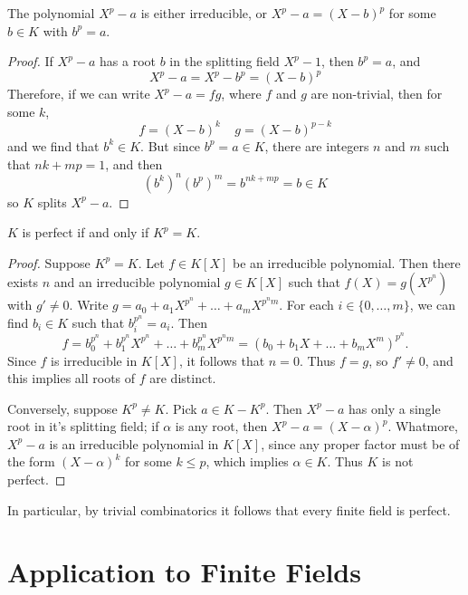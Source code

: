 \begin{lemma}
	The polynomial $X^p - a$ is either irreducible, or $X^p - a = (X - b)^p$ for some $b \in K$ with $b^p = a$.
\end{lemma}
\begin{proof}
    If $X^p - a$ has a root $b$ in the splitting field $X^p - 1$, then $b^p = a$, and
    \[ X^p - a = X^p - b^p = (X - b)^p \]
    Therefore, if we can write $X^p - a = fg$, where $f$ and $g$ are non-trivial, then for some $k$,
    \[ f = (X - b)^k\ \ \ \ \ g = (X - b)^{p - k} \]
    and we find that $b^k \in K$. But since $b^p = a \in K$, there are integers $n$ and $m$ such that $nk + mp = 1$, and then
    \[ (b^k)^n(b^p)^m = b^{nk + mp} = b \in K \]
    so $K$ splits $X^p - a$.
\end{proof}

\begin{prop}
    $K$ is perfect if and only if $K^p = K$.
\end{prop}
\begin{proof}
	Suppose $K^p = K$. Let $f \in K[X]$ be an irreducible polynomial. Then there exists $n$ and an irreducible polynomial $g \in K[X]$ such that $f(X) = g(X^{p^n})$ with $g' \neq 0$. Write $g = a_0 + a_1 X^{p^n} + \dots + a_m X^{p^nm}$. For each $i \in \{ 0, \dots, m \}$, we can find $b_i \in K$ such that $b_i^{p^n} = a_i$. Then
	\[ f = b_0^{p^n} + b_1^{p^n} X^{p^n} + \dots + b_m^{p^n} X^{p^nm} = (b_0 + b_1 X + \dots + b_m X^m)^{p^n}. \]
	Since $f$ is irreducible in $K[X]$, it follows that $n = 0$. Thus $f = g$, so $f' \neq 0$, and this implies all roots of $f$ are distinct.

	Conversely, suppose $K^p \neq K$. Pick $a \in K - K^p$. Then $X^p - a$ has only a single root in it's splitting field; if $\alpha$ is any root, then $X^p - a = (X - \alpha)^p$. Whatmore, $X^p - a$ is an irreducible polynomial in $K[X]$, since any proper factor must be of the form $(X - \alpha)^k$ for some $k \leq p$, which implies $\alpha \in K$. Thus $K$ is not perfect.
\end{proof}

\begin{remark}
	In particular, by trivial combinatorics it follows that every finite field is perfect.
\end{remark}





\section{Application to Finite Fields}

